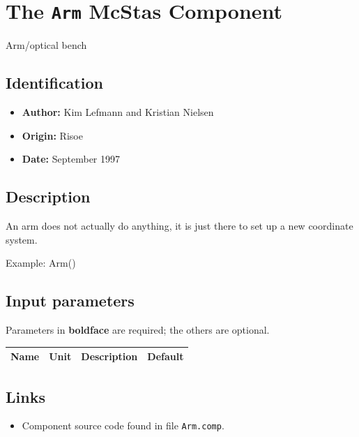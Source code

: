 \section{The \texttt{Arm} McStas Component}
Arm/optical bench

\subsection*{Identification}
\begin{itemize}
  \item \textbf{Author:} Kim Lefmann and Kristian Nielsen
  \item \textbf{Origin:} Risoe
  \item \textbf{Date:} September 1997
\end{itemize}

\subsection*{Description}
An arm does not actually do anything, it is just there to set up a new coordinate system.

Example: Arm()

\subsection*{Input parameters}
Parameters in \textbf{boldface} are required; the others are optional.

\begin{longtable}{p{}p{}p{}p{}}
\toprule
\textbf{Name} & \textbf{Unit} & \textbf{Description} & \textbf{Default} \\
\midrule
\endhead
\bottomrule
\end{longtable}

\subsection*{Links}
\begin{itemize}
  \item Component source code found in file \texttt{Arm.comp}.
\end{itemize}

